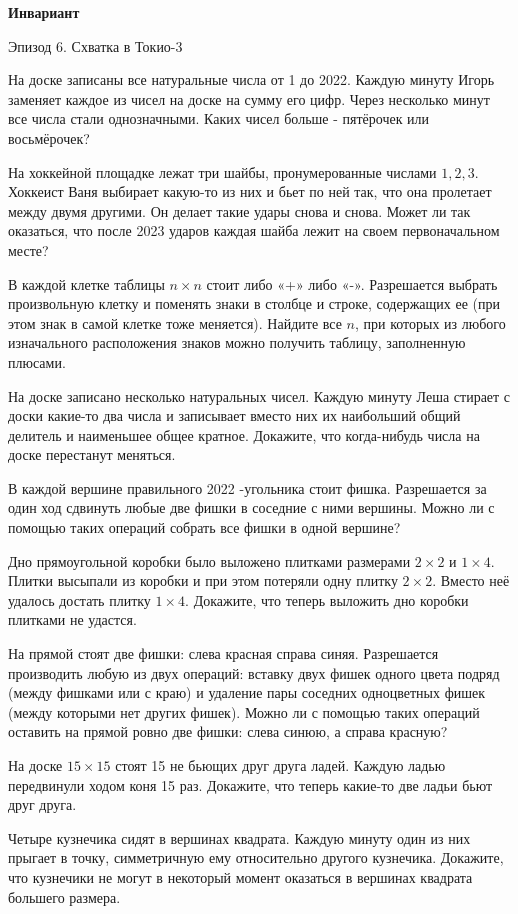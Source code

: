 \centerline{\bf \Huge Инвариант}


\begin{flushright}
        \scriptsize{Эпизод 6. Схватка в Токио-3}
\end{flushright}

На доске записаны все натуральные числа от 1 до 2022. Каждую минуту Игорь заменяет каждое из чисел на доске на сумму его цифр. Через несколько минут все числа стали однозначными. Каких чисел больше - пятёрочек или восьмёрочек?

На хоккейной площадке лежат три шайбы, пронумерованные числами $1,2,3$. Хоккеист Ваня выбирает какую-то из них и бьет по ней так, что она пролетает между двумя другими. Он делает такие удары снова и снова. Может ли так оказаться, что после 2023 ударов каждая шайба лежит на своем первоначальном месте?

В каждой клетке таблицы $n \times n$ стоит либо «+» либо «-». Разрешается выбрать произвольную клетку и поменять знаки в столбце и строке, содержащих ее (при этом знак в самой клетке тоже меняется). Найдите все $n$, при которых из любого изначального расположения знаков можно получить таблицу, заполненную плюсами.

На доске записано несколько натуральных чисел. Каждую минуту Леша стирает с доски какие-то два числа и записывает вместо них их наибольший общий делитель и наименьшее общее кратное. Докажите, что когда-нибудь числа на доске перестанут меняться.

В каждой вершине правильного 2022 -угольника стоит фишка. Разрешается за один ход сдвинуть любые две фишки в соседние с ними вершины. Можно ли с помощью таких операций собрать все фишки в одной вершине?

Дно прямоугольной коробки было выложено плитками размерами $2 \times 2$ и $1 \times 4$. Плитки высыпали из коробки и при этом потеряли одну плитку $2 \times 2$. Вместо неё удалось достать плитку $1 \times 4$. Докажите, что теперь выложить дно коробки плитками не удастся.

На прямой стоят две фишки: слева красная справа синяя. Разрешается производить любую из двух операций: вставку двух фишек одного цвета подряд (между фишками или с краю) и удаление пары соседних одноцветных фишек (между которыми нет других фишек). Можно ли с помощью таких операций оставить на прямой ровно две фишки: слева синюю, а справа красную?

На доске $15 \times 15$ стоят 15 не бьющих друг друга ладей. Каждую ладью передвинули ходом коня 15 раз. Докажите, что теперь какие-то две ладьи бьют друг друга.

\newpage

\hspace{3mm}

Четыре кузнечика сидят в вершинах квадрата. Каждую минуту один из них прыгает в точку, симметричную ему относительно другого кузнечика. Докажите, что кузнечики не могут в некоторый момент оказаться в вершинах квадрата большего размера.